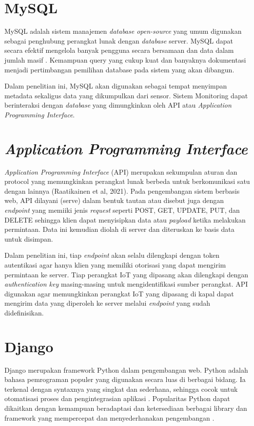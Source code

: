 \section{MySQL}

MySQL adalah sistem manajemen \textit{database open-source} yang umum digunakan sebagai penghubung perangkat lunak dengan \textit{database} server. MySQL dapat secara efektif mengelola banyak pengguna secara bersamaan dan data dalam jumlah masif \parencite{article:gomez}. Kemampuan query yang cukup kuat dan banyaknya dokumentasi menjadi pertimbangan pemilihan database pada sistem yang akan dibangun.

Dalam penelitian ini, MySQL akan digunakan sebagai tempat menyimpan metadata sekaligus data yang dikumpulkan dari sensor. Sistem Monitoring dapat berinteraksi dengan \textit{database} yang dimungkinkan oleh API atau \textit{Application Programming Interface}.


\section{\textit{Application Programming Interface}}
\textit{Application Programming Interface} (API) merupakan sekumpulan aturan dan protocol yang memungkinkan perangkat lunak berbeda untuk berkomunikasi satu dengan lainnya (Raatikainen et al, 2021). Pada pengembangan sistem berbasis web, API dilayani (serve) dalam bentuk tautan atau disebut juga dengan \textit{endpoint} yang memiiki jenis \textit{request} seperti POST, GET, UPDATE, PUT, dan DELETE sehingga klien dapat menyisipkan data atau \textit{payload} ketika melakukan permintaan. Data ini kemudian diolah di server dan diteruskan ke basis data untuk disimpan.

Dalam penelitian ini, tiap \textit{endpoint} akan selalu dilengkapi dengan token autentikasi agar hanya klien yang memiliki otorisasi yang dapat mengirim permintaan ke server. Tiap perangkat IoT yang dipasang akan dilengkapi dengan \textit{authentication key} masing-masing untuk mengidentifikasi sumber perangkat. API digunakan agar memungkinkan perangkat IoT yang dipasang di kapal dapat mengirim data yang diperoleh ke server melalui \textit{endpoint} yang sudah didefinisikan.

\section{Django}

	Django merupakan framework Python dalam pengembangan web. Python adalah bahasa pemrograman populer yang digunakan secara luas di berbagai bidang. Ia terkenal dengan syntaxnya yang singkat dan sederhana, sehingga cocok untuk otomatisasi proses dan pengintegrasian aplikasi \cite{article:buhler}. Popularitas Python dapat dikaitkan dengan kemampuan beradaptasi dan ketersediaan berbagai library dan framework yang mempercepat dan menyederhanakan pengembangan \cite{article:malloy}.

